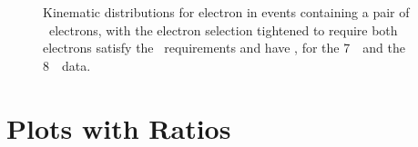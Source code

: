 \begin{figure}[h]
{        }
    \caption[Lepton kinematic distributions for \dilep\ events in the 7~\tev\
    data. ]
    {\small Kinematic distributions for
    electron  in events containing a pair of
    \ossf\ electrons, with the electron selection tightened to require both
    electrons satisfy the \mediumPP\ requirements and have \ptgt{20}, for the 7~\tev\ and the 8~\tev\ data. }
\label{fig:dilep-lepkin-seven}
\end{figure}

\section{Plots with Ratios}
\graphicspath{{Chapters/Backup/Figures/}}

